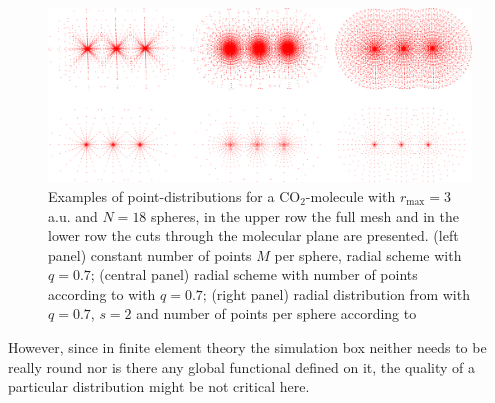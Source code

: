 \begin{figure}
   \includegraphics[width=\textwidth]{Figures/CO2_grid}
   \caption{Examples of point-distributions for a CO$_2$-molecule with $r_\text{max}=3\,$a.u. and $N=18$ spheres, in the upper row the full mesh and in the lower row the cuts through the molecular plane are presented.
   (left panel) constant number of points $M$ per sphere, radial scheme  with $q=0.7$; (central panel) radial scheme  with number of points according to  with $q=0.7$; (right panel) radial distribution from  with $q=0.7$, $s=2$ and number of points per sphere according to }
   \label{fig:molmesh}
\end{figure}
However, since in finite element theory the simulation box neither needs to be really round nor is there any global functional defined on it, the quality of a particular distribution might be not critical here.


